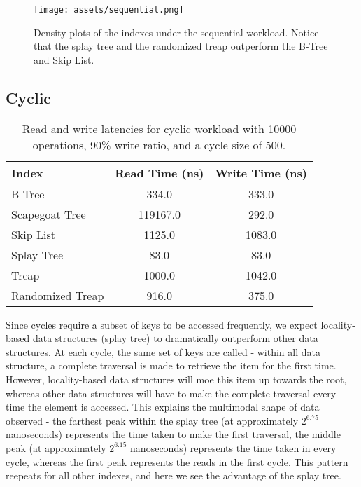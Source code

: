 \documentclass[sigconf]{acmart}
\begin{document}
\begin{center}
  \begin{figure}[H]
    \texttt{[image: assets/sequential.png]}
    \caption{Density plots of the indexes under the sequential workload. Notice that the splay tree and the randomized treap outperform the B-Tree and Skip List.}
  \end{figure}
\end{center}

\subsection{Cyclic}
\begin{center}
  \begin{table}[H]
    \begin{tabular}{|l|c|c|}
      \hline
      \bf{Index} & \bf{Read Time (ns)} & \bf{Write Time (ns)} \\
      \hline
      B-Tree&334.0&333.0\\
      \hline
      Scapegoat Tree&119167.0&292.0\\
      \hline
      Skip List&1125.0&1083.0\\
      \hline
      Splay Tree&83.0&83.0\\
      \hline
      Treap&1000.0&1042.0\\
      \hline
      Randomized Treap&916.0&375.0\\
      \hline
    \end{tabular}
    \caption{Read and write latencies for cyclic workload with 10000 operations, 90\% write ratio, and a cycle size of 500.}
  \end{table}
\end{center}

Since cycles require a subset of keys to be accessed frequently, we expect locality-based data structures (splay tree) to dramatically outperform other data structures.
At each cycle, the same set of keys are called - within all data structure, a complete traversal is made to retrieve the item for the first time. However, locality-based data structures will moe this item up towards the root, whereas other data structures will have to make the complete traversal every time the element is accessed. 
This explains the multimodal shape of data observed - the farthest peak within the splay tree (at approximately $2^{6.75}$ nanoseconds) represents the time taken to make the first traversal, the middle peak (at approximately $2^{6.15}$ nanoseconds) represents the time taken in every cycle, whereas the first peak represents the reads in the first cycle. This pattern reepeats for all other indexes, and here we see the advantage of the splay tree.
\end{document}
